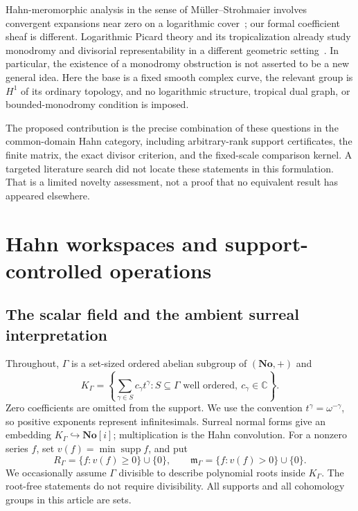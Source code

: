 \documentclass[11pt,letterpaper]{article}
\numberwithin{equation}{section}
\theoremstyle{definition}
\theoremstyle{remark}
\newcommand{\C}{\mathbb C}
\newcommand{\No}{\mathbf{No}}
\newcommand{\mm}{\mathfrak m}
\newcommand{\supp}{\operatorname{supp}}
\newcommand{\Kg}{K_\Gamma}
\newcommand{\rg}{R_\Gamma}
\newcommand{\mg}{\mm_\Gamma}
\begin{document}
Hahn-meromorphic analysis in the sense of M\"uller--Strohmaier involves
convergent expansions near zero on a logarithmic cover~\cite{muller};
our formal coefficient sheaf is different. Logarithmic Picard theory and
its tropicalization already study monodromy and divisorial
representability in a different geometric setting~\cite{molchowise}.
In particular, the existence of a monodromy obstruction is not asserted
to be a new general idea. Here the base is a fixed smooth complex curve,
the relevant group is $H^1$ of its ordinary topology, and no logarithmic
structure, tropical dual graph, or bounded-monodromy condition is imposed.

The proposed contribution is the precise combination of these questions
in the common-domain Hahn category, including arbitrary-rank support
certificates, the finite matrix, the exact divisor criterion, and the
fixed-scale comparison kernel. A targeted literature search did not
locate these statements in this formulation. That is a limited novelty
assessment, not a proof that no equivalent result has appeared elsewhere.

\section{Hahn workspaces and support-controlled operations}
\label{sec:support}

\subsection{The scalar field and the ambient surreal interpretation}
Throughout, $\Gamma$ is a set-sized ordered abelian subgroup of
$(\No,+)$ and
\begin{equation}
 \Kg=\left\{\sum_{\gamma\in S}c_\gamma t^\gamma:
          S\subseteq\Gamma\text{ well ordered},\ c_\gamma\in\C\right\}.
 \label{eq:hahnfield}
\end{equation}
Zero coefficients are omitted from the support. We use the convention
$t^\gamma=\omega^{-\gamma}$, so positive exponents represent
infinitesimals. Surreal normal forms give an embedding
$\Kg\hookrightarrow\No[i]$; multiplication is the Hahn convolution.
For a nonzero series $f$, set $v(f)=\min\supp f$, and put
\[
 \rg=\{f:v(f)\ge0\}\cup\{0\},\qquad
 \mg=\{f:v(f)>0\}\cup\{0\}.
\]
We occasionally assume $\Gamma$ divisible to describe polynomial roots
inside $\Kg$. The root-free statements do not require divisibility.
All supports and all cohomology groups in this article are sets.
\end{document}
